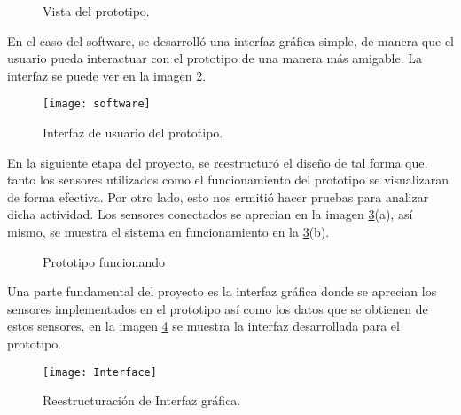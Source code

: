 \begin{figure}[H]
	\begin{center}
	\end{center}
	\label{hardwareda}
	\caption{Vista del prototipo.}
\end{figure} 

En el caso del software, se desarroll\'o una interfaz gr\'afica simple, de manera que el usuario pueda interactuar con el prototipo de una manera m\'as amigable. La interfaz se puede ver en la imagen \ref{software}.

\begin{figure}[H]
	\begin{center}
		\texttt{[image: software]}
	\end{center}
	\caption{Interfaz de usuario del prototipo.}
	\label{software}
\end{figure} 

En la siguiente etapa del proyecto, se reestructur\'o el dise\~no de tal forma que, tanto los sensores utilizados como el funcionamiento del prototipo se visualizaran de forma efectiva. Por otro lado, esto nos ermiti\'o hacer pruebas para analizar dicha actividad. Los sensores conectados se aprecian en la imagen \ref{hardwarep}(a), as\'i mismo, se muestra el sistema en funcionamiento en la \ref{hardwarep}(b).

\begin{figure}[H]
	\begin{center}
	\end{center}
	\label{hardwarep}
	\caption{Prototipo funcionando}
\end{figure}

Una parte fundamental del proyecto es la interfaz gr\'afica donde se aprecian los sensores implementados en el prototipo as\'i como los datos que se obtienen de estos sensores, en la imagen \ref{interfaz} se muestra la interfaz desarrollada para el prototipo.
\begin{figure}[H]
	\begin{center}
		\texttt{[image: Interface]}
	\end{center}
	\caption{Reestructuraci\'on de Interfaz gr\'afica.}
	\label{interfaz}
\end{figure} 